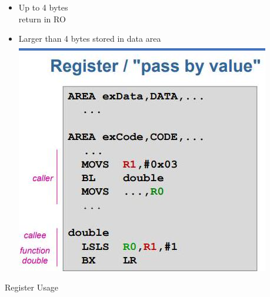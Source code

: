 \documentclass[10pt]{article}
\begin{document}
\begin{itemize}
  \item Up to 4 bytes\\
return in RO
  \item Larger than 4 bytes stored in data area\\
\includegraphics[width=\linewidth]{images/2024_12_29_79e6b22f503fb7b4f718g-09(2)}
\end{itemize}

Register Usage
\end{document}
